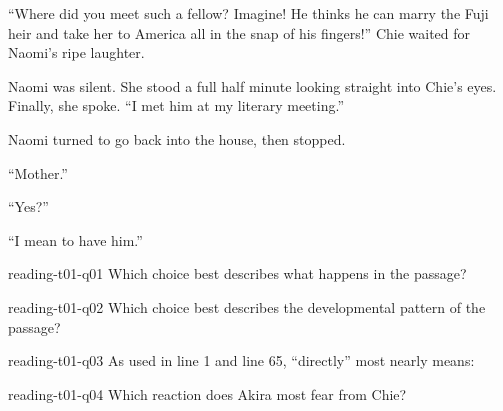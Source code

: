 {``Where did you meet such a fellow? 
Imagine! He thinks he can marry the Fuji heir and take her to America all in the snap of his fingers!''
Chie waited for Naomi's ripe laughter.


Naomi was silent. 
She stood a full half minute looking straight into Chie's eyes. 
Finally, she spoke.  ``I met him at my literary meeting.''


Naomi turned to go back into the house, then stopped.

``Mother.''

``Yes?''

``I mean to have him.''


\begin{question}{reading-t01-q01}
    Which choice best describes what happens in the passage?
    \begin{choices}
    \end{choices}
\end{question}

\begin{question}{reading-t01-q02}
    Which choice best describes the developmental pattern of the passage?
    \begin{choices}
    \end{choices}
\end{question}

\begin{question}{reading-t01-q03}
    As used in line 1 and line 65, ``directly'' most nearly means:
    \begin{choices}
    \end{choices}
\end{question}

\begin{question}{reading-t01-q04}
    Which reaction does Akira most fear from Chie?
    \begin{choices}
    \end{choices}
\end{question}

}
